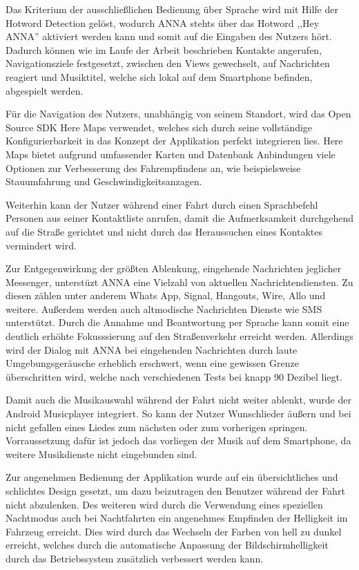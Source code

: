 Das Kriterium der ausschließlichen Bedienung über Sprache wird mit Hilfe der Hotword Detection gelöst, wodurch \ac{ANNA} stehts über das Hotword ,,Hey ANNA'' aktiviert werden kann und somit auf die Eingaben des Nutzers hört. Dadurch können wie im Laufe der Arbeit beschrieben Kontakte angerufen, Navigationsziele festgesetzt, zwischen den Views gewechselt, auf Nachrichten reagiert und Musiktitel, welche sich lokal auf dem Smartphone befinden, abgespielt werden.

Für die Navigation des Nutzers, unabhängig von seinem Standort, wird das Open Source SDK Here Maps verwendet, welches sich durch seine vollständige Konfigurierbarkeit in das Konzept der Applikation perfekt integrieren lies. Here Maps bietet aufgrund umfassender Karten und Datenbank Anbindungen viele Optionen zur Verbesserung des Fahrempfindens an, wie beispielsweise Stauumfahrung und Geschwindigkeitsanzagen.

Weiterhin kann der Nutzer während einer Fahrt durch einen Sprachbefehl Personen aus seiner Kontaktliste anrufen, damit die Aufmerksamkeit durchgehend auf die Straße gerichtet und nicht durch das Heraussuchen eines Kontaktes vermindert wird.

Zur Entgegenwirkung der größten Ablenkung, eingehende Nachrichten jeglicher Messenger, unterstüzt \ac{ANNA} eine Vielzahl von aktuellen Nachrichtendiensten. Zu diesen zählen unter anderem Whats App, Signal, Hangouts, Wire, Allo und weitere. Außerdem werden auch altmodische Nachrichten Dienste wie SMS unterstützt. Durch die Annahme und Beantwortung per Sprache kann somit eine deutlich erhöhte Fokusssierung auf den Straßenverkehr erreicht werden. Allerdings wird der Dialog mit \ac{ANNA} bei eingehenden Nachrichten durch laute Umgebungsgeräusche erheblich erschwert, wenn eine gewissen Grenze überschritten wird, welche nach verschiedenen Tests bei knapp 90 Dezibel liegt. 

Damit auch die Musikauswahl während der Fahrt nicht weiter ablenkt, wurde der Android Musicplayer integriert. So kann der Nutzer Wunschlieder äußern und bei nicht gefallen eines Liedes zum nächsten oder zum vorherigen springen. Vorraussetzung dafür ist jedoch das vorliegen der Musik auf dem Smartphone, da weitere Musikdienste nicht eingebunden sind. 

Zur angenehmen Bedienung der Applikation wurde auf ein übersichtliches und schlichtes Design gesetzt, um dazu beizutragen den Benutzer während der Fahrt nicht abzulenken. Des weiteren wird durch die Verwendung eines speziellen Nachtmodus auch bei Nachtfahrten ein angenehmes Empfinden der Helligkeit im Fahrzeug erreicht. Dies wird durch das Wechseln der Farben von hell zu dunkel erreicht, welches durch die automatische Anpassung der Bildschirmhelligkeit durch das Betriebssystem zusätzlich verbessert werden kann.  

